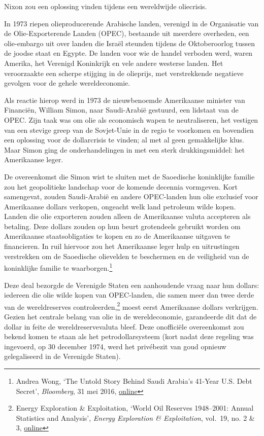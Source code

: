 \documentclass[smalldemyvopaper,11pt,twoside,onecolumn,openright,extrafontsizes,hidelinks]{memoir}
\begin{document}
Nixon zou een oplossing vinden tijdens een wereldwijde oliecrisis.

In 1973 riepen olieproducerende Arabische landen, verenigd in de
Organisatie van de Olie-Exporterende Landen (OPEC), bestaande uit
meerdere overheden, een olie-embargo uit over landen die Israël steunden
tijdens de Oktoberoorlog tussen de joodse staat en Egypte. De landen
voor wie de handel verboden werd, waren Amerika, het Verenigd Koninkrijk
en vele andere westerse landen. Het veroorzaakte een scherpe stijging in
de olieprijs, met verstrekkende negatieve gevolgen voor de gehele
wereldeconomie.

Als reactie hierop werd in 1973 de nieuwbenoemde Amerikaanse minister
van Financiën, William Simon, naar Saudi-Arabië gestuurd, een lidstaat
van de OPEC. Zijn taak was om olie als economisch wapen te
neutraliseren, het vestigen van een stevige greep van de Sovjet-Unie in
de regio te voorkomen en bovendien een oplossing voor de dollarcrisis te
vinden; al met al geen gemakkelijke klus. Maar Simon ging de
onderhandelingen in met een sterk drukkingsmiddel: het Amerikaanse
leger.

De overeenkomst die Simon wist te sluiten met de Saoedische koninklijke
familie zou het geopolitieke landschap voor de komende decennia
vormgeven. Kort samengevat, zouden Saudi-Arabië en andere OPEC-landen
hun olie exclusief voor Amerikaanse dollars verkopen, ongeacht welk land
petroleum wilde kopen. Landen die olie exporteren zouden alleen de
Amerikaanse valuta accepteren als betaling. Deze dollars zouden op hun
beurt grotendeels gebruikt worden om Amerikaanse staatsobligaties te
kopen en zo de Amerikaanse uitgaven te financieren. In ruil hiervoor zou
het Amerikaanse leger hulp en uitrustingen verstrekken om de Saoedische
olievelden te beschermen en de veiligheid van de koninklijke familie te
waarborgen.\footnote{Andrea Wong, `The Untold Story Behind Saudi
  Arabia's 41-Year U.S. Debt Secret', \emph{Bloomberg}, 31 mei 2016,
  \href{https://www.bloomberg.com/news/features/2016-05-30/the-untold-story-behind-saudi-arabia-s-41-year-u-s-debt-secret}{online}}

Deze deal bezorgde de Verenigde Staten een aanhoudende vraag naar hun
dollars: iedereen die olie wilde kopen van OPEC-landen, die samen meer
dan twee derde van de wereldreserves controleerden,\footnote{Energy
  Exploration \& Exploitation, `World Oil Reserves 1948--2001: Annual
  Statistics and Analysis', \emph{Energy Exploration \& Exploitation},
  vol.~19, no. 2 \& 3,
  \href{https://journals.sagepub.com/doi/pdf/10.1260/0144598011492561}{online}}
moest eerst Amerikaanse dollars verkrijgen. Gezien het centrale belang
van olie in de wereldeconomie, garandeerde dit dat de dollar in feite de
wereldreservevaluta bleef. Deze onofficiële overeenkomst zou bekend
komen te staan als het petrodollarsysteem (kort nadat deze regeling was
ingevoerd, op 30 december 1974, werd het privébezit van goud opnieuw
gelegaliseerd in de Verenigde Staten).
\end{document}
